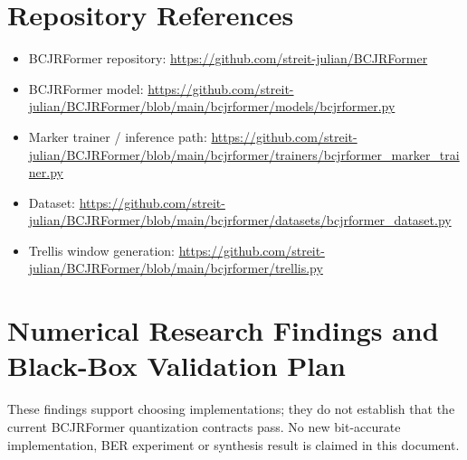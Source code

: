 \documentclass[11pt,a4paper]{article}
\begin{document}

\section{Repository References}

\begin{itemize}
    \item BCJRFormer repository:
    \url{https://github.com/streit-julian/BCJRFormer}
    \item BCJRFormer model:
    \url{https://github.com/streit-julian/BCJRFormer/blob/main/bcjrformer/models/bcjrformer.py}
    \item Marker trainer / inference path:
    \url{https://github.com/streit-julian/BCJRFormer/blob/main/bcjrformer/trainers/bcjrformer_marker_trainer.py}
    \item Dataset:
    \url{https://github.com/streit-julian/BCJRFormer/blob/main/bcjrformer/datasets/bcjrformer_dataset.py}
    \item Trellis window generation:
    \url{https://github.com/streit-julian/BCJRFormer/blob/main/bcjrformer/trellis.py}
\end{itemize}

\section{Numerical Research Findings and Black-Box Validation Plan}
These findings support choosing implementations; they do not establish that the current BCJRFormer quantization contracts pass. No new bit-accurate implementation, BER experiment or synthesis result is claimed in this document.
\end{document}
